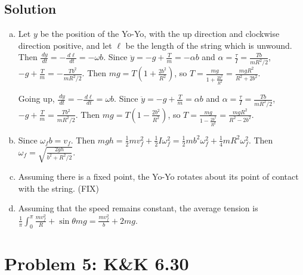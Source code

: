\documentclass[solutions]{esg8012pset}
\renewcommand{\d}{\,d}
\begin{document}
\subsection*{Solution}
  \begin{enumerate}[(a)]
    \item Let $y$ be the position of the Yo-Yo, with the up direction and clockwise direction positive, and let $\ell$ be the length of the string which is unwound.  Then $\frac{\d y}{\d t} = -\frac{\d \ell}{\d t} = -\omega b$.  Since $\ddot y = - g + \frac{T}{m} = -\alpha b$ and $\alpha = \frac{\tau}{I} = \frac{T b}{m R^2 / 2}$, $- g + \frac{T}{m} = -\frac{T b^2}{m R^2 / 2}$.  Then $m g = T\left(1 + \frac{2b^2}{R^2}\right)$, so $T = \frac{m g}{1 + \frac{2b^2}{R^2}} = \frac{m g R^2}{R^2 + 2b^2}$. \par
      Going up, $\frac{\d y}{\d t} = -\frac{\d \ell}{\d t} = \omega b$.  Since $\ddot y = -g + \frac{T}{m} = \alpha b$ and $\alpha = \frac{\tau}{I} = \frac{T b}{m R^2 / 2}$, $- g + \frac{T}{m} = \frac{T b^2}{m R^2 / 2}$.  Then $m g = T\left(1 - \frac{2b^2}{R^2}\right)$, so $T = \frac{m g}{1 - \frac{2b^2}{R^2}} = \frac{m g R^2}{R^2 - 2b^2}$.
    \item Since $\omega_f b = v_f$.  Then $m g h = \frac{1}{2} m v_f^2 + \frac{1}{2} I \omega_f^2 = \frac{1}{2} m b^2 \omega_f^2 + \frac{1}{4}mR^2 \omega_f^2$.  Then $\omega_f = \sqrt{\frac{2 g h}{b^2+R^2/2}}$.
    \item Assuming there is a fixed point, the Yo-Yo rotates about its point of contact with the string.  (FIX)
    \item Assuming that the speed remains constant, the average tension is $\frac{1}{\pi}\int_0^\pi \frac{m v_f^2}{R} + \sin\theta m g = \frac{m v_f^2}{b} + 2 m g$.
  \end{enumerate}
\section*{Problem 5: K\&K 6.30}
\end{document}
